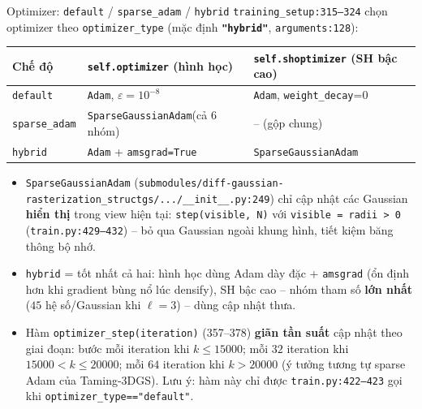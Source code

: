 \begin{frame}{Optimizer: \texttt{default} / \texttt{sparse\_adam} / \texttt{hybrid}}
\scriptsize
\texttt{training\_setup:315--324} chọn optimizer theo \texttt{optimizer\_type} (mặc định \textbf{\texttt{"hybrid"}}, \texttt{arguments:128}):
\vspace{0.1cm}
\centering
\begin{tabular}{lll}
\toprule
\textbf{Chế độ} & \texttt{self.optimizer} (hình học) & \texttt{self.shoptimizer} (SH bậc cao) \\
\midrule
\texttt{default}     & \texttt{Adam}, $\varepsilon=10^{-8}$ & \texttt{Adam}, \texttt{weight\_decay}=0 \\
\texttt{sparse\_adam}& \texttt{SparseGaussianAdam}(cả 6 nhóm) & -- (gộp chung) \\
\texttt{hybrid}      & \texttt{Adam} + \texttt{amsgrad=True} & \texttt{SparseGaussianAdam} \\
\bottomrule
\end{tabular}
\vspace{0.2cm}
\flushleft
\begin{itemize}
    \item \texttt{SparseGaussianAdam} (\texttt{submodules/diff-gaussian-rasterization\_structgs/.../\_\_init\_\_.py:249}) chỉ cập nhật các Gaussian \textbf{hiển thị} trong view hiện tại: \texttt{step(visible, N)} với \texttt{visible = radii > 0} (\texttt{train.py:429--432}) -- bỏ qua Gaussian ngoài khung hình, tiết kiệm băng thông bộ nhớ.
    \item \texttt{hybrid} = tốt nhất cả hai: hình học dùng Adam dày đặc + \texttt{amsgrad} (ổn định hơn khi gradient bùng nổ lúc densify), SH bậc cao -- nhóm tham số \textbf{lớn nhất} ($45$ hệ số/Gaussian khi $\ell=3$) -- dùng cập nhật thưa.
    \item Hàm \texttt{optimizer\_step(iteration)} (357--378) \textbf{giãn tần suất} cập nhật theo giai đoạn: bước mỗi iteration khi $k\le 15000$; mỗi $32$ iteration khi $15000<k\le 20000$; mỗi $64$ iteration khi $k>20000$ (ý tưởng tương tự sparse Adam của Taming-3DGS). Lưu ý: hàm này chỉ được \texttt{train.py:422--423} gọi khi \texttt{optimizer\_type=="default"}.
\end{itemize}
\end{frame}

